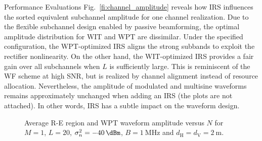 \documentclass[journal,12pt,onecolumn,draftclsnofoot]{IEEEtran}
\begin{document}
\begin{section}{Performance Evaluations}
		Fig.~\ref{fi:channel_amplitude} reveals how IRS influences the sorted equivalent subchannel amplitude for one channel realization. Due to the flexible subchannel design enabled by passive beamforming, the optimal amplitude distribution for WIT and WPT are dissimilar. Under the specified configuration, the WPT-optimized IRS aligns the strong subbands to exploit the rectifier nonlinearity. On the other hand, the WIT-optimized IRS provides a fair gain over all subchannels when $L$ is sufficiently large. This is reminiscent of the WF scheme at high SNR, but is realized by channel alignment instead of resource allocation. Nevertheless, the amplitude of modulated and multisine waveforms remains approximately unchanged when adding an IRS (the plots are not attached). In other words, IRS has a subtle impact on the waveform design.

		\begin{figure}[!t]
			\centering
			\caption{Average R-E region and WPT waveform amplitude versus $N$ for $M=1$, $L=20$, $\sigma_n^2=\SI{-40}{\dBm}$, $B=\SI{1}{\MHz}$ and $d_{\mathrm{H}}=d_{\mathrm{V}}=\SI{2}{\meter}$.}
		\end{figure}


\end{section}
\end{document}
